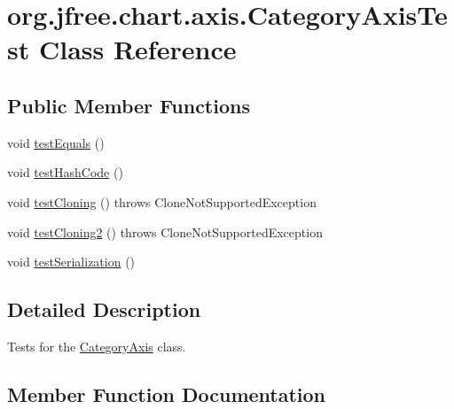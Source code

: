 \hypertarget{classorg_1_1jfree_1_1chart_1_1axis_1_1_category_axis_test}{}\section{org.\+jfree.\+chart.\+axis.\+Category\+Axis\+Test Class Reference}
\label{classorg_1_1jfree_1_1chart_1_1axis_1_1_category_axis_test}
\subsection*{Public Member Functions}
\begin{DoxyCompactItemize}
\item 
void \mbox{\hyperlink{classorg_1_1jfree_1_1chart_1_1axis_1_1_category_axis_test_a960bca9b253ee6ce401705fec56228ef}{test\+Equals}} ()
\item 
void \mbox{\hyperlink{classorg_1_1jfree_1_1chart_1_1axis_1_1_category_axis_test_a16b875cd6066e72eb719a90b20a24d3c}{test\+Hash\+Code}} ()
\item 
void \mbox{\hyperlink{classorg_1_1jfree_1_1chart_1_1axis_1_1_category_axis_test_a81c11ffc02fbe1acb85e414559ed7ab3}{test\+Cloning}} ()  throws Clone\+Not\+Supported\+Exception 
\item 
void \mbox{\hyperlink{classorg_1_1jfree_1_1chart_1_1axis_1_1_category_axis_test_a813ed3e625287f7ec5994e410feb1cfb}{test\+Cloning2}} ()  throws Clone\+Not\+Supported\+Exception 
\item 
void \mbox{\hyperlink{classorg_1_1jfree_1_1chart_1_1axis_1_1_category_axis_test_a1c4ebc54ee8d55c8b8836fb21e0f2506}{test\+Serialization}} ()
\end{DoxyCompactItemize}


\subsection{Detailed Description}
Tests for the \mbox{\hyperlink{classorg_1_1jfree_1_1chart_1_1axis_1_1_category_axis}{Category\+Axis}} class. 

\subsection{Member Function Documentation}
\mbox{\label{classorg_1_1jfree_1_1chart_1_1axis_1_1_category_axis_test_a81c11ffc02fbe1acb85e414559ed7ab3}} 
